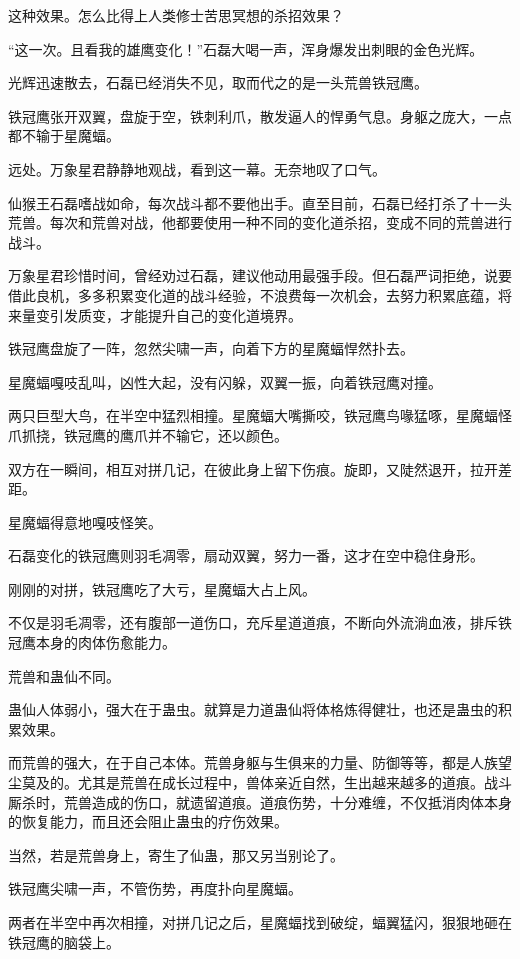 \begin{this_body}
这种效果。怎么比得上人类修士苦思冥想的杀招效果？

“这一次。且看我的雄鹰变化！”石磊大喝一声，浑身爆发出刺眼的金色光辉。

光辉迅速散去，石磊已经消失不见，取而代之的是一头荒兽铁冠鹰。

铁冠鹰张开双翼，盘旋于空，铁刺利爪，散发逼人的悍勇气息。身躯之庞大，一点都不输于星魔蝠。

远处。万象星君静静地观战，看到这一幕。无奈地叹了口气。

仙猴王石磊嗜战如命，每次战斗都不要他出手。直至目前，石磊已经打杀了十一头荒兽。每次和荒兽对战，他都要使用一种不同的变化道杀招，变成不同的荒兽进行战斗。

万象星君珍惜时间，曾经劝过石磊，建议他动用最强手段。但石磊严词拒绝，说要借此良机，多多积累变化道的战斗经验，不浪费每一次机会，去努力积累底蕴，将来量变引发质变，才能提升自己的变化道境界。

铁冠鹰盘旋了一阵，忽然尖啸一声，向着下方的星魔蝠悍然扑去。

星魔蝠嘎吱乱叫，凶性大起，没有闪躲，双翼一振，向着铁冠鹰对撞。

两只巨型大鸟，在半空中猛烈相撞。星魔蝠大嘴撕咬，铁冠鹰鸟喙猛啄，星魔蝠怪爪抓挠，铁冠鹰的鹰爪并不输它，还以颜色。

双方在一瞬间，相互对拼几记，在彼此身上留下伤痕。旋即，又陡然退开，拉开差距。

星魔蝠得意地嘎吱怪笑。

石磊变化的铁冠鹰则羽毛凋零，扇动双翼，努力一番，这才在空中稳住身形。

刚刚的对拼，铁冠鹰吃了大亏，星魔蝠大占上风。

不仅是羽毛凋零，还有腹部一道伤口，充斥星道道痕，不断向外流淌血液，排斥铁冠鹰本身的肉体伤愈能力。

荒兽和蛊仙不同。

蛊仙人体弱小，强大在于蛊虫。就算是力道蛊仙将体格炼得健壮，也还是蛊虫的积累效果。

而荒兽的强大，在于自己本体。荒兽身躯与生俱来的力量、防御等等，都是人族望尘莫及的。尤其是荒兽在成长过程中，兽体亲近自然，生出越来越多的道痕。战斗厮杀时，荒兽造成的伤口，就遗留道痕。道痕伤势，十分难缠，不仅抵消肉体本身的恢复能力，而且还会阻止蛊虫的疗伤效果。

当然，若是荒兽身上，寄生了仙蛊，那又另当别论了。

铁冠鹰尖啸一声，不管伤势，再度扑向星魔蝠。

两者在半空中再次相撞，对拼几记之后，星魔蝠找到破绽，蝠翼猛闪，狠狠地砸在铁冠鹰的脑袋上。


\end{this_body}
